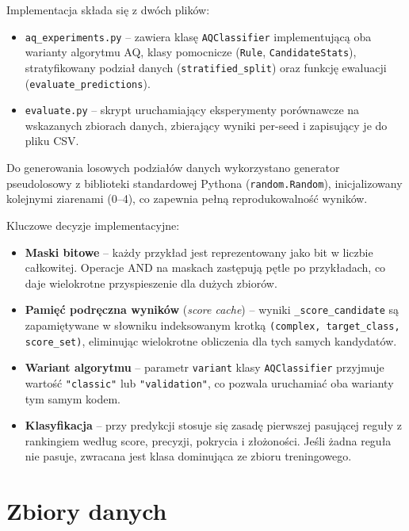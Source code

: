 \documentclass[12pt,a4paper]{article}
\begin{document}
Implementacja składa się z dwóch plików:

\begin{itemize}
  \item \texttt{aq\_experiments.py} -- zawiera klasę \texttt{AQClassifier}
        implementującą oba warianty algorytmu AQ, klasy pomocnicze
        (\texttt{Rule}, \texttt{CandidateStats}), stratyfikowany podział danych
        (\texttt{stratified\_split}) oraz funkcję ewaluacji
        (\texttt{evaluate\_predictions}).
  \item \texttt{evaluate.py} -- skrypt uruchamiający eksperymenty porównawcze
        na wskazanych zbiorach danych, zbierający wyniki per-seed
        i zapisujący je do pliku CSV.
\end{itemize}

Do generowania losowych podziałów danych wykorzystano generator pseudolosowy
z biblioteki standardowej Pythona (\texttt{random.Random}), inicjalizowany
kolejnymi ziarenami (0--4), co zapewnia pełną reprodukowalność wyników.

Kluczowe decyzje implementacyjne:

\begin{itemize}
  \item \textbf{Maski bitowe} -- każdy przykład jest reprezentowany jako bit
        w liczbie całkowitej. Operacje AND na maskach zastępują pętle po przykładach,
        co daje wielokrotne przyspieszenie dla dużych zbiorów.
  \item \textbf{Pamięć podręczna wyników} (\emph{score cache}) -- wyniki
        \texttt{\_score\_candidate} są zapamiętywane w słowniku indeksowanym
        krotką \texttt{(complex, target\_class, score\_set)}, eliminując
        wielokrotne obliczenia dla tych samych kandydatów.
  \item \textbf{Wariant algorytmu} -- parametr \texttt{variant} klasy
        \texttt{AQClassifier} przyjmuje wartość \texttt{"classic"} lub
        \texttt{"validation"}, co pozwala uruchamiać oba warianty tym samym kodem.
  \item \textbf{Klasyfikacja} -- przy predykcji stosuje się zasadę pierwszej
        pasującej reguły z rankingiem według score, precyzji, pokrycia i złożoności.
        Jeśli żadna reguła nie pasuje, zwracana jest klasa dominująca ze zbioru
        treningowego.
\end{itemize}

\section{Zbiory danych}
\end{document}
